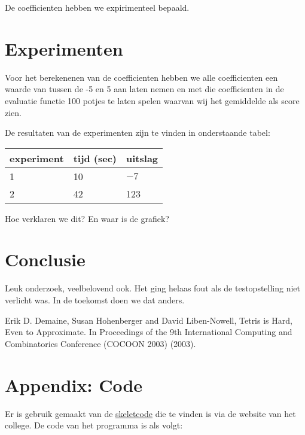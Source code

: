 \documentclass[10pt]{article}
\begin{document}
De coefficienten hebben we expirimenteel bepaald.

\section{Experimenten}

Voor het berekenenen van de coefficienten hebben we alle coefficienten een waarde van tussen de -5 en 5 aan laten nemen en met die coefficienten in de evaluatie functie 100 potjes te laten spelen waarvan wij het gemiddelde als score zien.


De resultaten van de experimenten zijn te
vinden in onderstaande tabel:

\begin{center}
\begin{tabular}{l|l|l}
experiment & tijd (sec) & uitslag\\
\hline
1 & 10 & $-7$\\
2 & 42 & 123
\end{tabular}
\end{center}
Hoe verklaren we dit? En waar is de grafiek?

\section{Conclusie}

Leuk onderzoek, veelbelovend ook. Het ging helaas 
fout als de testopstelling niet verlicht was.
In de toekomst doen we dat anders.

\begin{thebibliography}{XX}

Erik D. Demaine, Susan Hohenberger and David Liben-Nowell, Tetris is
Hard, Even to Approximate. In Proceedings of the 9th International Computing and
Combinatorics Conference (COCOON 2003) (2003).

\end{thebibliography}

\section*{Appendix: Code}

Er is gebruik gemaakt van de \href{http://www.liacs.leidenuniv.nl/~kosterswa/AI/iets.cc}{\underline{skeletcode}} die te vinden is via
de website van het college.
De code van het programma is als volgt:

\smallskip
\end{document}
